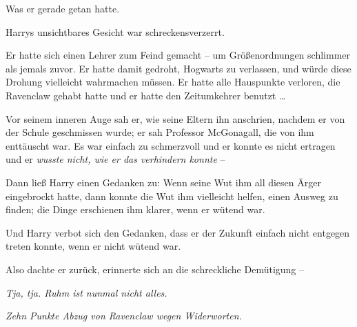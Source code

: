 Was er gerade getan hatte. 

Harrys unsichtbares Gesicht war schreckensverzerrt. 

Er hatte sich einen Lehrer zum Feind gemacht – um Größenordnungen schlimmer als jemals zuvor. Er hatte damit gedroht, Hogwarts zu verlassen, und würde diese Drohung vielleicht wahrmachen müssen. Er hatte alle Hauspunkte verloren, die Ravenclaw gehabt hatte und er hatte den Zeitumkehrer benutzt … 

Vor seinem inneren Auge sah er, wie seine Eltern ihn anschrien, nachdem er von der Schule geschmissen wurde; er sah Professor McGonagall, die von ihm enttäuscht war. Es war einfach zu schmerzvoll und er konnte es nicht ertragen und er \emph{wusste nicht, wie er das verhindern konnte} – 

Dann ließ Harry einen Gedanken zu: Wenn seine Wut ihm all diesen Ärger eingebrockt hatte, dann konnte die Wut ihm vielleicht helfen, einen Ausweg zu finden; die Dinge erschienen ihm klarer, wenn er wütend war. 

Und Harry verbot sich den Gedanken, dass er der Zukunft einfach nicht entgegen treten konnte, wenn er nicht wütend war. 

Also dachte er zurück, erinnerte sich an die schreckliche Demütigung – 

\emph{Tja, tja. Ruhm ist nunmal nicht alles.}

\emph{Zehn Punkte Abzug von Ravenclaw wegen Widerworten.}

